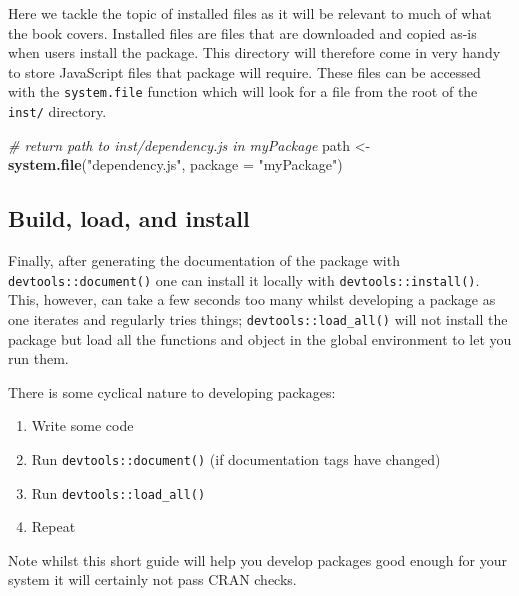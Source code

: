 \documentclass[
  10pt,
]{krantz}
\makeatletter
\newenvironment{Shaded}{\begin{snugshade}}{\end{snugshade}}
\newcommand{\CommentTok}[1]{\textcolor[rgb]{0.37,0.37,0.37}{\textit{#1}}}
\newcommand{\DataTypeTok}[1]{\textcolor[rgb]{0.27,0.27,0.27}{#1}}
\newcommand{\KeywordTok}[1]{\textcolor[rgb]{0.27,0.27,0.27}{\textbf{#1}}}
\newcommand{\NormalTok}[1]{#1}
\newcommand{\StringTok}[1]{\textcolor[rgb]{0.5,0.5,0.5}{#1}}
\providecommand{\tightlist}{%
  \setlength{\itemsep}{0pt}\setlength{\parskip}{0pt}}
\newenvironment{kframe}{%
\medskip{}
\setlength{\fboxsep}{.8em}
 \def\at@end@of@kframe{}%
 \ifinner\ifhmode%
  \def\at@end@of@kframe{\end{minipage}}%
  \begin{minipage}{\columnwidth}%
 \fi\fi%
 \def\FrameCommand##1{\hskip\@totalleftmargin \hskip-\fboxsep
 \colorbox{shadecolor}{##1}\hskip-\fboxsep
     \hskip-\linewidth \hskip-\@totalleftmargin \hskip\columnwidth}%
 \MakeFramed {\advance\hsize-\width
   \@totalleftmargin\z@ \linewidth\hsize
   \@setminipage}}%
 {\par\unskip\endMakeFramed%
 \at@end@of@kframe}
\renewenvironment{Shaded}{\begin{kframe}}{\end{kframe}}
\makeatother
\begin{document}
Here we tackle the topic of installed files as it will be relevant to much of what the book covers. Installed files are files that are downloaded and copied as-is when users install the package. This directory will therefore come in very handy to store JavaScript files that package will require. These files can be accessed with the \texttt{system.file} function which will look for a file from the root of the \texttt{inst/} directory.

\begin{Shaded}
\begin{Highlighting}[]
\CommentTok{\# return path to \textasciigrave{}inst/dependency.js\textasciigrave{} in \textasciigrave{}myPackage\textasciigrave{}}
\NormalTok{path <{-}}\StringTok{ }\KeywordTok{system.file}\NormalTok{(}\StringTok{"dependency.js"}\NormalTok{, }\DataTypeTok{package =} \StringTok{"myPackage"}\NormalTok{)}
\end{Highlighting}
\end{Shaded}

\hypertarget{basics-build-load-install}{%
\subsection{Build, load, and install}\label{basics-build-load-install}}

Finally, after generating the documentation of the package with \texttt{devtools::document()} one can install it locally with \texttt{devtools::install()}. This, however, can take a few seconds too many whilst developing a package as one iterates and regularly tries things; \texttt{devtools::load\_all()} will not install the package but load all the functions and object in the global environment to let you run them.

There is some cyclical nature to developing packages:

\begin{enumerate}
\def\labelenumi{\arabic{enumi}.}
\tightlist
\item
  Write some code
\item
  Run \texttt{devtools::document()} (if documentation tags have changed)
\item
  Run \texttt{devtools::load\_all()}
\item
  Repeat
\end{enumerate}

Note whilst this short guide will help you develop packages good enough for your system it will certainly not pass CRAN checks.
\end{document}
